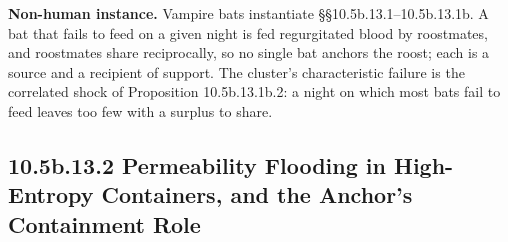 \documentclass[
]{article}
\begin{document}
\textbf{Non-human instance.} Vampire bats instantiate
§§10.5b.13.1--10.5b.13.1b. A bat that fails to feed on a given night is
fed regurgitated blood by roostmates, and roostmates share reciprocally,
so no single bat anchors the roost; each is a source and a recipient of
support. The cluster's characteristic failure is the correlated shock of
Proposition 10.5b.13.1b.2: a night on which most bats fail to feed
leaves too few with a surplus to share.

\hypertarget{b.13.2-permeability-flooding-in-high-entropy-containers-and-the-anchors-containment-role}{%
\subsection{10.5b.13.2 Permeability Flooding in High-Entropy Containers,
and the Anchor's Containment
Role}\label{b.13.2-permeability-flooding-in-high-entropy-containers-and-the-anchors-containment-role}}
\end{document}
